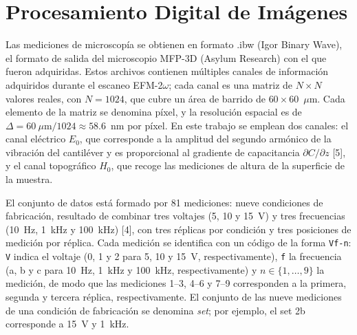 \section{Procesamiento Digital de Imágenes}
\label{sec:met_procesamiento}
Las mediciones de microscopía se obtienen en formato .ibw (Igor Binary Wave), el formato de salida del microscopio MFP-3D (Asylum Research) con el que fueron adquiridas. Estos archivos contienen múltiples canales de información adquiridos durante el escaneo EFM-2$\omega$; cada canal es una matriz de $N\times N$ valores reales, con $N = 1024$, que cubre un área de barrido de $60\times60$~$\mu$m. Cada elemento de la matriz se denomina píxel, y la resolución espacial es de $\Delta = 60~\mu\text{m}/1024 \approx 58.6$~nm por píxel. En este trabajo se emplean dos canales: el canal eléctrico $E_0$, que corresponde a la amplitud del segundo armónico de la vibración del cantiléver y es proporcional al gradiente de capacitancia $\partial C/\partial z$ [5], y el canal topográfico $H_0$, que recoge las mediciones de altura de la superficie de la muestra.

El conjunto de datos está formado por 81 mediciones: nueve condiciones de fabricación, resultado de combinar tres voltajes (5, 10 y 15~V) y tres frecuencias (10~Hz, 1~kHz y 100~kHz) [4], con tres réplicas por condición y tres posiciones de medición por réplica. Cada medición se identifica con un código de la forma \texttt{Vf-n}: \texttt{V} indica el voltaje (0, 1 y 2 para 5, 10 y 15~V, respectivamente), \texttt{f} la frecuencia (a, b y c para 10~Hz, 1~kHz y 100~kHz, respectivamente) y $n \in \{1, \dots, 9\}$ la medición, de modo que las mediciones 1--3, 4--6 y 7--9 corresponden a la primera, segunda y tercera réplica, respectivamente. El conjunto de las nueve mediciones de una condición de fabricación se denomina \emph{set}; por ejemplo, el set 2b corresponde a 15~V y 1~kHz.

